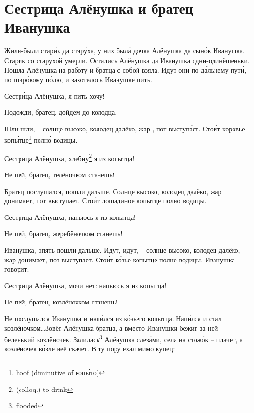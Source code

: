 \section{Сестрица Алёнушка и братец Иванушка}
Жили-были стар\'{и}к да стар\'{у}ха, у них был\'{а} дочка Алёнушка да сын\'{о}к Иванушка. Старик со старухой умерли. Остались Алёнушка да Иванушка одни-одинёшеньки. Пошла Алёнушка на работу и братца с собой взяла. Идут они по д\'{а}льнему пут\'{и}, по шир\'{о}кому п\'{о}лю, и захотелось Иванушке пить.
%
\begin{dialogue}
    \item Сестр\'{и}ца Алёнушка, я пить хочу!
    \item Подожди, братец, дойдем до кол\'{о}дца.
\end{dialogue}
%
Шли-шли, -- солнце высоко, колодец далёко, жар , пот выступ\'{а}ет. Сто\'{и}т коровье коп\'{ы}тце\footnote{hoof (diminutive of коп\'{ы}то)} полн\'{о} водицы.
%
\begin{dialogue}
    \item Сестрица Алёнушка, хлебну\footnote{(colloq.) to drink} я из копытца!
    \item Не пей, братец, телёночком станешь!
\end{dialogue}
%
Братец послушался, пошли дальше. Солнце высоко, колодец далёко, жар донимает, пот выступает. Сто\'{и}т лошадиное копытце полно водицы.
%
\begin{dialogue}
    \item Сестрица Алёнушка, напьюсь я из копытца!
    \item Не пей, братец, жеребёночком станешь!
\end{dialogue}
%
 Иванушка, опять пошли дальше. Идут, идут, -- солнце высоко, колодец далёко, жар донимает, пот выступает. Сто\'{и}т к\'{о}зье копытце полно водицы. Иванушка говорит:
%
\begin{dialogue}
    \item  Сестрица Алёнушка, мочи нет: напьюсь я из копытца!
    \item  Не пей, братец, козлёночком станешь!
\end{dialogue}
%
Не послушался Иванушка и нап\'{и}лся из к\'{о}зьего копытца. Нап\'{и}лся и стал козлёночком\dots Зовёт Алёнушка братца, а вместо Иванушки бежит за ней беленький козлёночек. Залилась\footnote{flooded} Алёнушка слез\'{а}ми, села на стож\'{о}к -- плачет, а козлёночек в\'{о}зле неё скачет. В ту пору ехал мимо купец:
